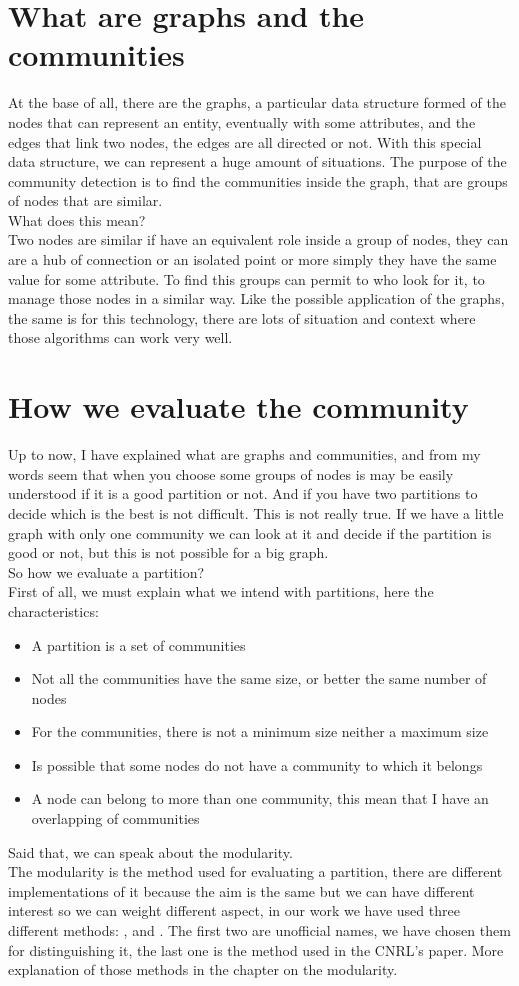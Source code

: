 \documentclass[epsfig,a4paper,11pt,titlepage,twoside,openany]{book}
\begin{document}
\section{What are graphs and the communities}
At the base of all, there are the graphs, a particular data structure formed of the nodes that can represent an entity, eventually with some attributes, and the edges that link two nodes, the edges are all directed or not. With this special data structure, we can represent a huge amount of situations. The purpose of the community detection is to find the communities inside the graph, that are groups of nodes that are similar.\\
What does this mean?\\
Two nodes are similar if have an equivalent role inside a group of nodes, they can are a hub of connection or an isolated point or more simply they have the same value for some attribute. To find this groups can permit to who look for it, to manage those nodes in a similar way. Like the possible application of the graphs, the same is for this technology, there are lots of situation and context where those algorithms can work very well.
%
\section{How we evaluate the community}
Up to now, I have explained what are graphs and communities, and from my words seem that when you choose some groups of nodes is may be easily understood if it is a good partition or not. And if you have two partitions to decide which is the best is not difficult. This is not really true. If we have a little graph with only one community we can look at it and decide if the partition is good or not, but this is not possible for a big graph.\\
So how we evaluate a partition?\\
First of all, we must explain what we intend with partitions, here the characteristics:
\begin{itemize}
	\item A partition is a set of communities
	\item Not all the communities have the same size, or better the same number of nodes
	\item For the communities, there is not a minimum size neither a maximum size
	\item Is possible that some nodes do not have a community to which it belongs
	\item A node can belong to more than one community, this mean that I have an overlapping of communities
\end{itemize}
Said that, we can speak about the modularity.\\
The modularity is the method used for evaluating a partition, there are different implementations of it because the aim is the same but we can have different interest so we can weight different aspect, in our work we have used three different methods: \mmax, \mover and \mmod . The first two are unofficial names, we have chosen them for distinguishing it, the last one is the method used in the CNRL's paper. More explanation of those methods in the chapter on the modularity.
%
\end{document}
